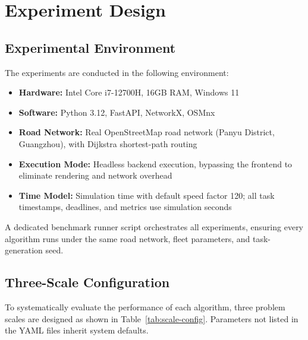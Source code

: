 
\chapter{Experiment Design}

\section{Experimental Environment}

The experiments are conducted in the following environment:

\begin{itemize}[leftmargin=4em]
    \item \textbf{Hardware:} Intel Core i7-12700H, 16GB RAM, Windows 11
    \item \textbf{Software:} Python 3.12, FastAPI, NetworkX, OSMnx
    \item \textbf{Road Network:} Real OpenStreetMap road network (Panyu District, Guangzhou), with Dijkstra shortest-path routing
    \item \textbf{Execution Mode:} Headless backend execution, bypassing the frontend to eliminate rendering and network overhead
    \item \textbf{Time Model:} Simulation time with default speed factor 120; all task timestamps, deadlines, and metrics use simulation seconds
\end{itemize}

A dedicated benchmark runner script orchestrates all experiments, ensuring every algorithm runs under the same road network, fleet parameters, and task-generation seed.

\section{Three-Scale Configuration}

To systematically evaluate the performance of each algorithm, three problem scales are designed as shown in Table~\ref{tab:scale-config}. Parameters not listed in the YAML files inherit system defaults.

